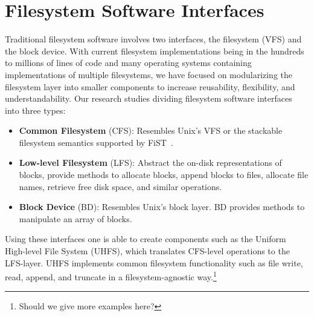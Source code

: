 \section{Filesystem Software Interfaces}

Traditional filesystem software involves two interfaces, the
filesystem (VFS) and the block device. With current filesystem
implementations being in the hundreds to millions of lines of code and
many operating systems containing implementations of multiple
filesystems, we have focused on modularizing the filesystem layer into
smaller components to increase reusability, flexibility, and
understandability. Our research studies dividing filesystem software
interfaces into three types:

\begin{itemize}
\item \textbf{Common Filesystem} (CFS): Resembles Unix's VFS or the
  stackable filesystem semantics supported by FiST~\cite{fist}.
\item \textbf{Low-level Filesystem} (LFS): Abstract the on-disk
  representations of blocks, provide methods to allocate blocks,
  append blocks to files, allocate file names, retrieve free disk
  space, and similar operations.
\item \textbf{Block Device} (BD): Resembles Unix's block layer. BD
  provides methods to manipulate an array of blocks.
\end{itemize}

Using these interfaces one is able to create components such as the
Uniform High-level File System (UHFS), which translates CFS-level
operations to the LFS-layer. UHFS implements common filesystem
functionality such as file write, read, append, and truncate in a
filesystem-agnostic way.\footnote{Should we give more examples here?}
